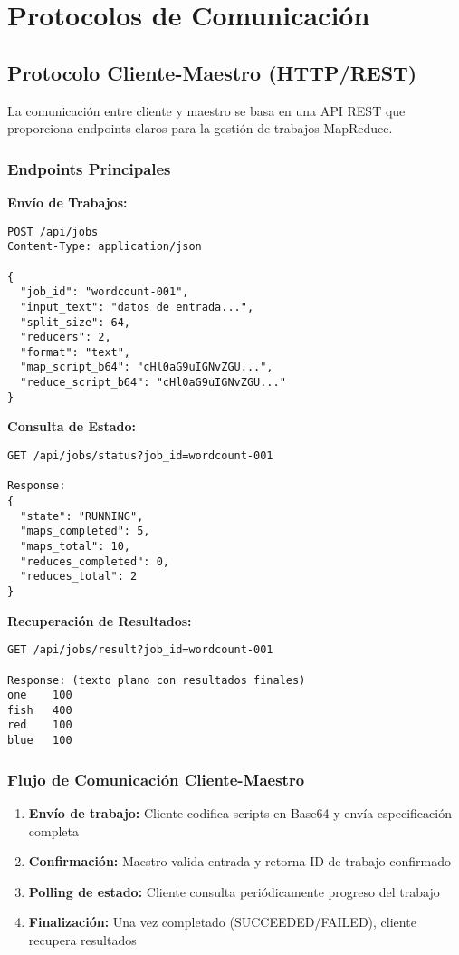 \section{Protocolos de Comunicación}

\subsection{Protocolo Cliente-Maestro (HTTP/REST)}

La comunicación entre cliente y maestro se basa en una API REST que proporciona endpoints claros para la gestión de trabajos MapReduce.

\subsubsection{Endpoints Principales}

\textbf{Envío de Trabajos:}
\begin{verbatim}
POST /api/jobs
Content-Type: application/json

{
  "job_id": "wordcount-001",
  "input_text": "datos de entrada...",
  "split_size": 64,
  "reducers": 2,
  "format": "text",
  "map_script_b64": "cHl0aG9uIGNvZGU...",
  "reduce_script_b64": "cHl0aG9uIGNvZGU..."
}
\end{verbatim}

\textbf{Consulta de Estado:}
\begin{verbatim}
GET /api/jobs/status?job_id=wordcount-001

Response:
{
  "state": "RUNNING",
  "maps_completed": 5,
  "maps_total": 10,
  "reduces_completed": 0,
  "reduces_total": 2
}
\end{verbatim}

\textbf{Recuperación de Resultados:}
\begin{verbatim}
GET /api/jobs/result?job_id=wordcount-001

Response: (texto plano con resultados finales)
one    100
fish   400
red    100
blue   100
\end{verbatim}

\subsubsection{Flujo de Comunicación Cliente-Maestro}

\begin{enumerate}
    \item \textbf{Envío de trabajo:} Cliente codifica scripts en Base64 y envía especificación completa
    \item \textbf{Confirmación:} Maestro valida entrada y retorna ID de trabajo confirmado
    \item \textbf{Polling de estado:} Cliente consulta periódicamente progreso del trabajo
    \item \textbf{Finalización:} Una vez completado (SUCCEEDED/FAILED), cliente recupera resultados
\end{enumerate}

